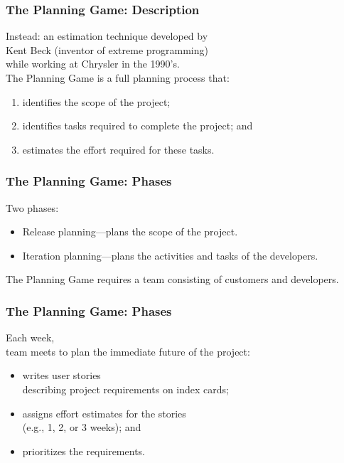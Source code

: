 \begin{frame}

\frametitle{The Planning Game: Description}

\begin{changemargin}{1cm}
Instead: an estimation technique developed by \\ Kent Beck (inventor of
extreme programming) \\ while working at Chrysler in the 1990's.\\[1em]

The Planning Game is a full planning process that:
\begin{enumerate}
\item identifies the scope of the project;
\item identifies tasks required to complete the project; and
\item estimates the effort required for these tasks.
\end{enumerate}
\end{changemargin}
\end{frame}

\begin{frame}

\frametitle{The Planning Game: Phases}

\begin{changemargin}{1cm}

Two phases: 
\begin{itemize}
\item Release planning---plans the scope of the project.
\item Iteration planning---plans the activities and tasks of the developers.
\end{itemize}

The Planning Game requires a team consisting of customers and developers.

\end{changemargin}
\end{frame}

\begin{frame}

\frametitle{The Planning Game: Phases}

\begin{changemargin}{1cm}

Each week, \\team meets to plan the immediate future of the project:

\begin{itemize}
\item writes user stories\\ describing project requirements on index cards;
\item assigns effort estimates for the stories \\ (e.g., 1, 2, or 3 weeks); and
\item prioritizes the requirements.
\end{itemize}

\end{changemargin}
\end{frame}

